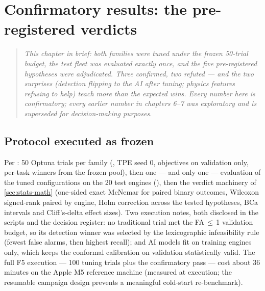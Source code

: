 \chapter{Confirmatory results: the pre-registered verdicts}
\label{ch:results}

\begin{quote}\itshape
This chapter in brief: both families were tuned under the frozen 50-trial budget, the test
fleet was evaluated exactly once, and the five pre-registered hypotheses were adjudicated.
Three confirmed, two refuted --- and the two surprises (detection flipping to the AI after
tuning; physics features refusing to help) teach more than the expected wins. Every number
here is confirmatory; every earlier number in chapters 6--7 was exploratory and is superseded
for decision-making purposes.
\end{quote}



\section{Protocol executed as frozen}
\label{sec:results-protocol}

Per : 50 Optuna trials per family
(, TPE seed 0, objectives on validation only, per-task winners from
the frozen pool), then one --- and only one --- evaluation of the tuned configurations on the
20 test engines (), then the verdict machinery of \cref{sec:stats-math} (one-sided exact
McNemar for paired binary outcomes, Wilcoxon signed-rank paired by engine, Holm correction
across the tested hypotheses, BCa intervals and Cliff's-delta effect sizes). Two execution notes, both disclosed in
the scripts and the decision register: no traditional trial met the FA\,$\leq$\,1 validation
budget, so its detection winner was selected by the lexicographic infeasibility rule (fewest
false alarms, then highest recall); and AI models fit on training engines only, which keeps
the conformal calibration on validation statistically valid. The full F5 execution ---
100 tuning trials plus the confirmatory pass --- cost about 36 minutes on the Apple M5
reference machine (measured at execution; the resumable campaign design prevents a meaningful
cold-start re-benchmark).

